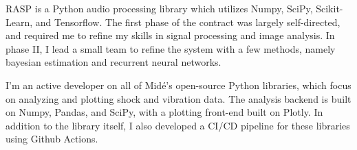 \documentclass[letterpaper]{deedy-resume} %
\begin{document}
\sectionspace %


RASP is a Python audio processing library which utilizes Numpy, SciPy, Scikit-Learn, and Tensorflow.  The first phase of the contract was largely self-directed, and required me to refine my skills in signal processing and image analysis.  In phase II, I lead a small team to refine the system with a few methods, namely bayesian estimation and recurrent neural networks.

\sectionspace %


I'm an active developer on all of Midé's open-source Python libraries, which focus on analyzing and plotting shock and vibration data.  The analysis backend is built on Numpy, Pandas, and SciPy, with a plotting front-end built on Plotly.  In addition to the library itself, I also developed a CI/CD pipeline for these libraries using Github Actions.

\sectionspace %


%
%


%
%
\end{document}
